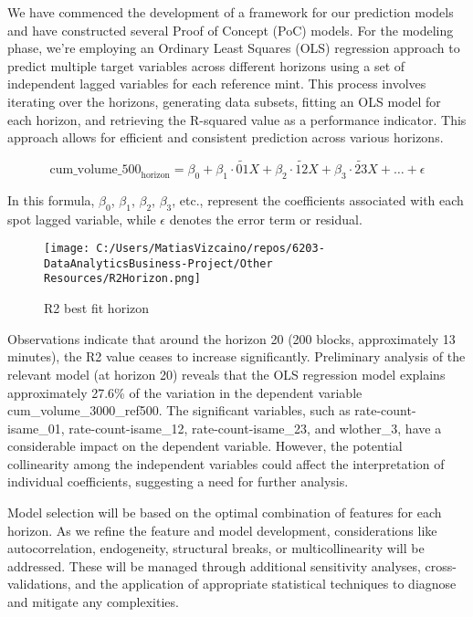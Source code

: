 \documentclass{article}
\begin{document}
{We have commenced the development of a framework for our prediction models and have constructed several Proof of Concept (PoC) models. For the modeling phase, we're employing an Ordinary Least Squares (OLS) regression approach to predict multiple target variables across different horizons using a set of independent lagged variables for each reference mint. This process involves iterating over the horizons, generating data subsets, fitting an OLS model for each horizon, and retrieving the R-squared value as a performance indicator. This approach allows for efficient and consistent prediction across various horizons.

\[
\text{{cum\_volume\_500}}_\text{{horizon}} = \beta_0 + \beta_1 \cdot \widetilde{01}X + \beta_2 \cdot \widetilde{12}X + \beta_3 \cdot \widetilde{23}X + \ldots + \epsilon
\]

In this formula, \(\beta_0\), \(\beta_1\), \(\beta_2\), \(\beta_3\), etc., represent the coefficients associated with each spot lagged variable, while \(\epsilon\) denotes the error term or residual.

\begin{wrapfigure}[16]{l}{0.35\textwidth}
\vspace{0pt} %
\centering
\texttt{[image: C:/Users/MatiasVizcaino/repos/6203-DataAnalyticsBusiness-Project/Other Resources/R2Horizon.png]}
\caption{R2 best fit horizon}
\label{fig:R2-horizon}
\end{wrapfigure}

Observations indicate that around the horizon 20 (200 blocks, approximately 13 minutes), the R2 value ceases to increase significantly. Preliminary analysis of the relevant model (at horizon 20) reveals that the OLS regression model explains approximately 27.6\% of the variation in the dependent variable cum\_volume\_3000\_ref500. The significant variables, such as rate-count-isame\_01, rate-count-isame\_12, rate-count-isame\_23, and wlother\_3, have a considerable impact on the dependent variable. However, the potential collinearity among the independent variables could affect the interpretation of individual coefficients, suggesting a need for further analysis.

Model selection will be based on the optimal combination of features for each horizon. As we refine the feature and model development, considerations like autocorrelation, endogeneity, structural breaks, or multicollinearity will be addressed. These will be managed through additional sensitivity analyses, cross-validations, and the application of appropriate statistical techniques to diagnose and mitigate any complexities.


}
\end{document}
